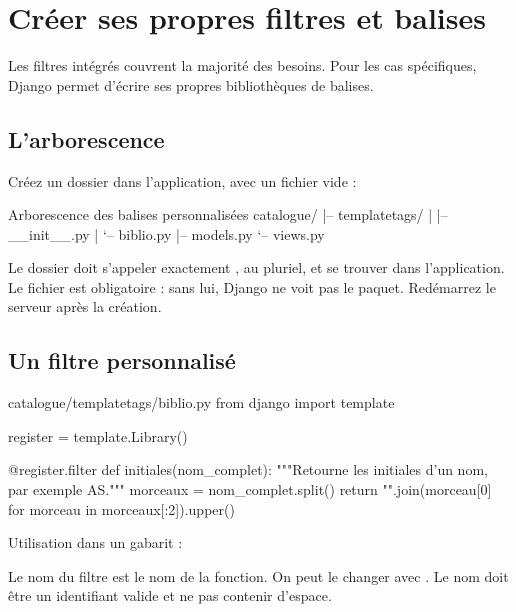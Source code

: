 \section{Créer ses propres filtres et balises}

Les filtres intégrés couvrent la majorité des besoins. Pour les cas spécifiques,
Django permet d'écrire ses propres bibliothèques de balises.

\subsection{L'arborescence}

Créez un dossier  dans l'application, avec un fichier
 vide :

\begin{codebox}[tree]{Arborescence des balises personnalisées}
catalogue/
|-- templatetags/
|   |-- __init__.py
|   `-- biblio.py
|-- models.py
`-- views.py
\end{codebox}

\begin{attention}
Le dossier doit s'appeler exactement , au pluriel, et se trouver
dans l'application. Le fichier  est obligatoire : sans lui,
Django ne voit pas le paquet. Redémarrez le serveur après la création.
\end{attention}

\subsection{Un filtre personnalisé}

\begin{codebox}[python]{catalogue/templatetags/biblio.py}
from django import template

register = template.Library()


@register.filter
def initiales(nom_complet):
    """Retourne les initiales d'un nom, par exemple AS."""
    morceaux = nom_complet.split()
    return "".join(morceau[0] for morceau in morceaux[:2]).upper()
\end{codebox}

Utilisation dans un gabarit :


\begin{note}
Le nom du filtre est le nom de la fonction. On peut le changer avec
. Le nom doit être un identifiant valide et
ne pas contenir d'espace.
\end{note}

